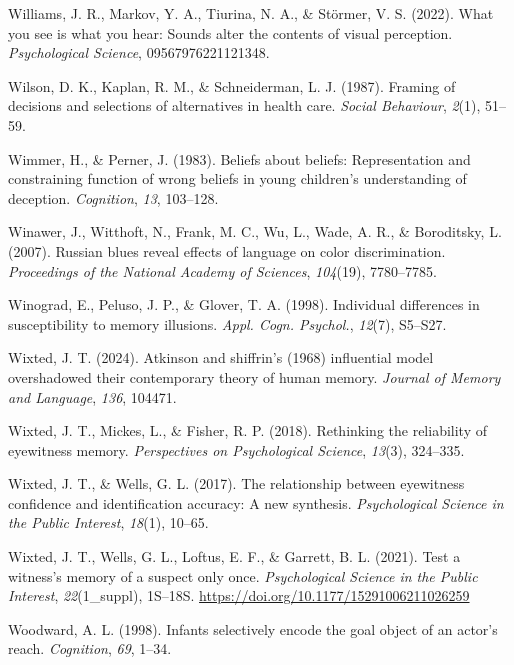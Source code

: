 \documentclass[
]{krantz}
\newlength{\cslhangindent}
\newenvironment{CSLReferences}[2] %
 {\begin{list}{}{%
  \setlength{\itemindent}{0pt}
  \setlength{\leftmargin}{0pt}
  \setlength{\parsep}{0pt}
  \ifodd #1
   \setlength{\leftmargin}{\cslhangindent}
   \setlength{\itemindent}{-1\cslhangindent}
  \fi
  \setlength{\itemsep}{#2\baselineskip}}}
 {\end{list}}
\begin{document}
\begin{CSLReferences}{1}{0}
Williams, J. R., Markov, Y. A., Tiurina, N. A., \& Störmer, V. S. (2022). What you see is what you hear: Sounds alter the contents of visual perception. \emph{Psychological Science}, 09567976221121348.

Wilson, D. K., Kaplan, R. M., \& Schneiderman, L. J. (1987). Framing of decisions and selections of alternatives in health care. \emph{Social Behaviour}, \emph{2}(1), 51--59.

Wimmer, H., \& Perner, J. (1983). Beliefs about beliefs: Representation and constraining function of wrong beliefs in young children's understanding of deception. \emph{Cognition}, \emph{13}, 103--128.

Winawer, J., Witthoft, N., Frank, M. C., Wu, L., Wade, A. R., \& Boroditsky, L. (2007). Russian blues reveal effects of language on color discrimination. \emph{Proceedings of the National Academy of Sciences}, \emph{104}(19), 7780--7785.

Winograd, E., Peluso, J. P., \& Glover, T. A. (1998). Individual differences in susceptibility to memory illusions. \emph{Appl. Cogn. Psychol.}, \emph{12}(7), S5--S27.

Wixted, J. T. (2024). Atkinson and shiffrin's (1968) influential model overshadowed their contemporary theory of human memory. \emph{Journal of Memory and Language}, \emph{136}, 104471.

Wixted, J. T., Mickes, L., \& Fisher, R. P. (2018). Rethinking the reliability of eyewitness memory. \emph{Perspectives on Psychological Science}, \emph{13}(3), 324--335.

Wixted, J. T., \& Wells, G. L. (2017). The relationship between eyewitness confidence and identification accuracy: A new synthesis. \emph{Psychological Science in the Public Interest}, \emph{18}(1), 10--65.

Wixted, J. T., Wells, G. L., Loftus, E. F., \& Garrett, B. L. (2021). Test a witness's memory of a suspect only once. \emph{Psychological Science in the Public Interest}, \emph{22}(1\_suppl), 1S--18S. \url{https://doi.org/10.1177/15291006211026259}

Woodward, A. L. (1998). Infants selectively encode the goal object of an actor's reach. \emph{Cognition}, \emph{69}, 1--34.


\end{CSLReferences}
\end{document}
